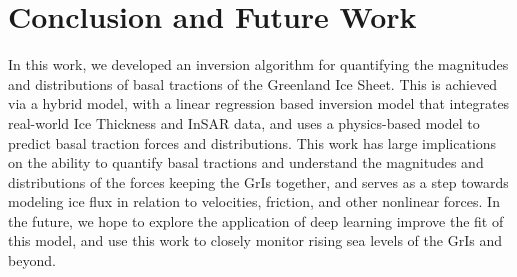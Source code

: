 \documentclass{article}
\begin{document}
\section{Conclusion and Future Work}

In this work, we developed an inversion algorithm for quantifying the magnitudes and distributions of basal tractions of the Greenland Ice Sheet. This is achieved via a hybrid model, with a linear regression based inversion model that integrates real-world Ice Thickness and InSAR data, and uses a physics-based model to predict basal traction forces and distributions. This work has large implications on the ability to quantify basal tractions and understand the magnitudes and distributions of the forces keeping the GrIs together, and serves as a step towards modeling ice flux in relation to velocities, friction, and other nonlinear forces. In the future, we hope to explore the application of deep learning improve the fit of this model, and use this work to closely monitor rising sea levels of the GrIs and beyond.



\end{document}
